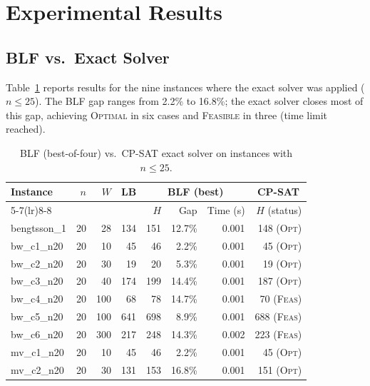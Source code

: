 \documentclass[11pt,a4paper]{article}
\begin{document}
\section{Experimental Results}

\subsection{BLF vs.\ Exact Solver}

Table~\ref{tab:exact} reports results for the nine instances where the exact
solver was applied ($n \le 25$).
The BLF gap ranges from 2.2\% to 16.8\%;
the exact solver closes most of this gap, achieving \textsc{Optimal} in six
cases and \textsc{Feasible} in three (time limit reached).

\begin{table}[h]
\centering
\caption{BLF (best-of-four) vs.\ CP-SAT exact solver on instances with $n \le 25$.}
\label{tab:exact}
\small
\setlength{\tabcolsep}{5pt}
\begin{tabular}{lrrr rrr r}
\toprule
\multirow{2}{*}{Instance} &
\multirow{2}{*}{$n$} &
\multirow{2}{*}{$W$} &
\multirow{2}{*}{LB} &
\multicolumn{3}{c}{BLF (best)} &
\multicolumn{1}{c}{CP-SAT} \\
\cmidrule(lr){5-7}\cmidrule(lr){8-8}
& & & & $H$ & Gap & Time (s) & $H$ (status) \\
\midrule
bengtsson\_1   & 20 & 28 & 134 & 151 & 12.7\% & 0.001 & 148 (\textsc{Opt}) \\
bw\_c1\_n20    & 20 & 10 &  45 &  46 &  2.2\% & 0.001 &  45 (\textsc{Opt}) \\
bw\_c2\_n20    & 20 & 30 &  19 &  20 &  5.3\% & 0.001 &  19 (\textsc{Opt}) \\
bw\_c3\_n20    & 20 & 40 & 174 & 199 & 14.4\% & 0.001 & 187 (\textsc{Opt}) \\
bw\_c4\_n20    & 20 &100 &  68 &  78 & 14.7\% & 0.001 &  70 (\textsc{Feas}) \\
bw\_c5\_n20    & 20 &100 & 641 & 698 &  8.9\% & 0.001 & 688 (\textsc{Feas}) \\
bw\_c6\_n20    & 20 &300 & 217 & 248 & 14.3\% & 0.002 & 223 (\textsc{Feas}) \\
mv\_c1\_n20    & 20 & 10 &  45 &  46 &  2.2\% & 0.001 &  45 (\textsc{Opt}) \\
mv\_c2\_n20    & 20 & 30 & 131 & 153 & 16.8\% & 0.001 & 151 (\textsc{Opt}) \\
\bottomrule
\end{tabular}
\end{table}
\end{document}
